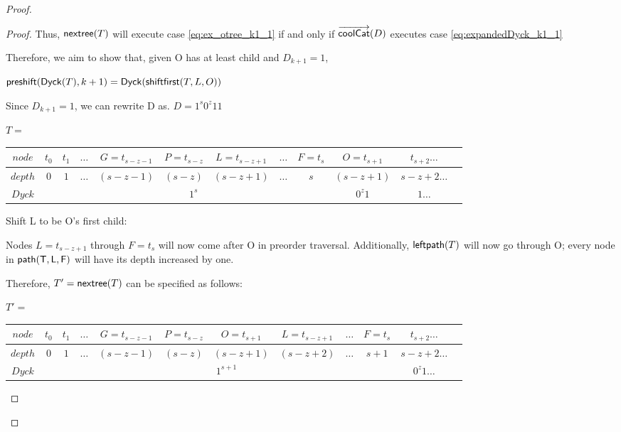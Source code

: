 \begin{proof}
\begin{proof}
    Thus, $\mathsf{nextree}{(T)}$ will execute case \ref{eq:ex_otree_k1_1} if and only if $\overrightarrow{\mathsf{coolCat}}{(D)}$ executes case \ref{eq:expandedDyck_k1_1}

    Therefore, we aim to show that, given O has at least child and $D_{k+1}=1$,

    $\mathsf{preshift(} \mathsf{Dyck}{(T)}, k+1 \mathsf{)}=\mathsf{Dyck}{(\mathsf{shiftfirst(} T, L, O \mathsf{)})}$

    Since $D_{k+1}=1$, we can rewrite D as.
    $D=1^s0^z11$


    \noindent $T=$
    \begin{center}
	\begin{tabular}{ |c|c|c|c|c|c|c|c|c|c|c|c| } 
	    \hline

	    $node$ & $t_0$ & $t_1$ & $\dots$ & $G=t_{s-z-1}$ & $P=t_{s-z}$ & $L=t_{s-z+1}$ & $\dots$ & $F=t_s$ & $O=t_{s+1}$ & $t_{s+2}\dots$ \\
	    \hline
	    $depth$ & $0$ & $1$ & $\dots$ & $(s-z-1)$ & $(s-z)$ & $(s-z+1)$ & $\dots$ & $s$  & $(s-z+1)$ & $s-z+2 \dots$\\
	    \hline
	    $Dyck$ &  &  \multicolumn{7}{|c|}{$1^s$} &  $0^{z}1$   & $1\dots$\\
	    \hline
	\end{tabular}
    \end{center}

    Shift L to be O's first child:

    Nodes $L=t_{s-z+1}$ through $F=t_s$ will now come after O in preorder traversal.  Additionally, $\mathsf{leftpath}{(T)}$ will now go through O; every node in $\mathsf{path({T}, L, F)}$ will have its depth increased by one.  

    Therefore, $T'=\mathsf{nextree}{(T)}$ can be specified as follows: 

    \noindent $T'=$
    \begin{center}
	\begin{tabular}{ |c|c|c|c|c|c|c|c|c|c|c|c| } 
	    \hline

	    $node$ & $t_0$ & $t_1$ & $\dots$ & $G=t_{s-z-1}$ & $P=t_{s-z}$ & $O=t_{s+1}$ & $L=t_{s-z+1}$ & $\dots$ & $F=t_s$  & $t_{s+2}\dots$ \\
	    \hline
	    $depth$ & $0$ & $1$ & $\dots$ & $(s-z-1)$ & $(s-z)$ & $(s-z+1)$ & $(s-z+2)$ & $\dots$ & $s+1$  & $s-z+2 \dots$\\
	    \hline
	    $Dyck$ &  &  \multicolumn{8}{|c|}{$1^{s+1}$}  & $0^{z}1\dots$\\
	    \hline
	\end{tabular}
    \end{center}


\end{proof}
\end{proof}
